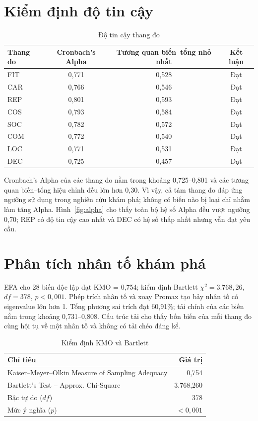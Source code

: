 \section{Kiểm định độ tin cậy}
\begin{table}[H]\centering\caption{Độ tin cậy thang đo}\label{tab:alpha}
\begin{tabular}{lccc}\toprule Thang đo & Cronbach's Alpha & Tương quan biến--tổng nhỏ nhất & Kết luận\\\midrule
FIT & 0,771 & 0,528 & Đạt\\ CAR & 0,766 & 0,546 & Đạt\\ REP & 0,801 & 0,593 & Đạt\\ COS & 0,793 & 0,584 & Đạt\\ SOC & 0,782 & 0,572 & Đạt\\ COM & 0,772 & 0,540 & Đạt\\ LOC & 0,771 & 0,531 & Đạt\\ DEC & 0,725 & 0,457 & Đạt\\\bottomrule
\end{tabular}\end{table}
Cronbach's Alpha của các thang đo nằm trong khoảng 0,725--0,801 và các tương quan biến--tổng hiệu chỉnh đều lớn hơn 0,30. Vì vậy, cả tám thang đo đáp ứng ngưỡng sử dụng trong nghiên cứu khám phá; không có biến nào bị loại chỉ nhằm làm tăng Alpha.
Hình~\ref{fig:alpha} cho thấy toàn bộ hệ số Alpha đều vượt ngưỡng 0,70; REP có độ tin cậy cao nhất và DEC có hệ số thấp nhất nhưng vẫn đạt yêu cầu.
\figReliability

\section{Phân tích nhân tố khám phá}
EFA cho 28 biến độc lập đạt KMO = 0,754; kiểm định Bartlett $\chi^2=3.768,26$, $df=378$, $p<0,001$. Phép trích nhân tố và xoay Promax tạo bảy nhân tố có eigenvalue lớn hơn 1. Tổng phương sai trích đạt 60,91\%; tải chính của các biến nằm trong khoảng 0,731--0,808. Cấu trúc tải cho thấy bốn biến của mỗi thang đo cùng hội tụ về một nhân tố và không có tải chéo đáng kể.

\begin{table}[H]\centering\caption{Kiểm định KMO và Bartlett}\label{tab:kmo}
\begin{tabular}{p{8.3cm}r}\toprule Chỉ tiêu & Giá trị\\\midrule
Kaiser--Meyer--Olkin Measure of Sampling Adequacy & 0,754\\
Bartlett's Test -- Approx. Chi-Square & 3.768,260\\
Bậc tự do ($df$) & 378\\
Mức ý nghĩa ($p$) & $<0,001$\\\bottomrule
\end{tabular}\end{table}

